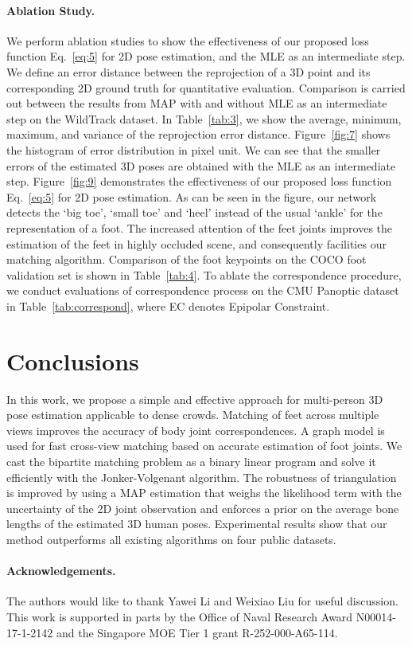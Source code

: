 \documentclass[runningheads]{llncs}
\begin{document}
\paragraph {\bf{Ablation Study. }} We perform ablation studies to show the effectiveness of our proposed loss function Eq.~\ref{eq:5} for 2D pose estimation, and the MLE as an intermediate step. We define an error distance between the reprojection of a 3D point and its corresponding 2D ground truth for quantitative evaluation. 
Comparison is carried out between the results from MAP with and without MLE as an intermediate step on the WildTrack dataset.
In Table~\ref{tab:3}, we show the average, minimum, maximum, and variance of the reprojection error distance. Figure~\ref{fig:7} shows the histogram of error distribution in pixel unit. We can see that the smaller errors of the estimated 3D poses are obtained with the MLE as an intermediate step. Figure~\ref{fig:9} demonstrates the effectiveness of our proposed loss function Eq.~\ref{eq:5} for 2D pose estimation. As can be seen in the figure, our network detects the `big toe', `small toe' and `heel' instead of the usual `ankle' for the representation of a foot. The increased attention of the feet joints improves the estimation of the feet in highly occluded scene, and consequently facilities our matching algorithm. Comparison of the foot keypoints on the COCO foot validation set is shown in Table~\ref{tab:4}. To ablate the correspondence procedure, we conduct evaluations of correspondence process on the CMU Panoptic dataset in Table~\ref{tab:correspond}, where EC denotes Epipolar Constraint.
\section{Conclusions}
In this work, we propose a simple and effective approach for multi-person 3D pose estimation applicable to dense crowds. Matching of feet across multiple views improves the accuracy of body joint correspondences. A graph model is used for fast cross-view matching based on accurate estimation of foot joints. We cast the bipartite matching problem as a binary linear program and solve it efficiently with the Jonker-Volgenant algorithm. The robustness of triangulation is improved by using a MAP estimation that weighs the likelihood term with the uncertainty of the 2D joint observation and enforces a prior on the average bone lengths of the estimated 3D human poses. Experimental results show that our method outperforms all existing algorithms on four public datasets.


\paragraph{\bf{Acknowledgements. }} The authors would like to thank Yawei Li and Weixiao Liu for useful discussion. This work is supported in parts by the Office of Naval Research Award N00014-17-1-2142 and the Singapore MOE Tier 1 grant
R-252-000-A65-114.
\clearpage


\end{document}
